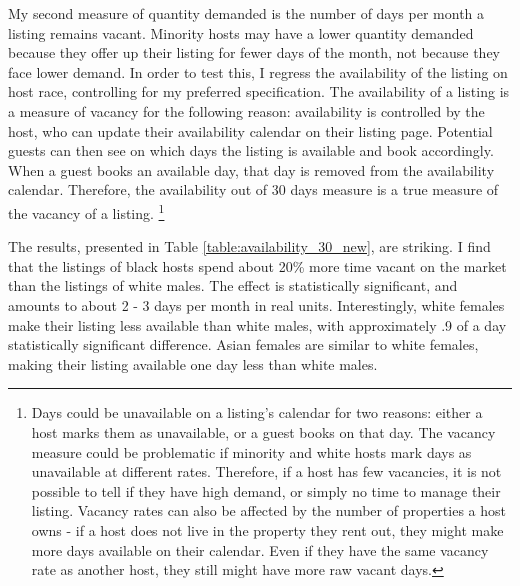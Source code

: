 
My second measure of quantity demanded is the number of days per month a listing remains vacant. Minority hosts may have a lower quantity demanded because they offer up their listing for fewer days of the month, not because they face lower demand. In order to test this, I regress the availability of the listing on host race, controlling for my preferred specification. The availability of a listing is a measure of vacancy for the following reason: availability is controlled by the host, who can update their availability calendar on their listing page. Potential guests can then see on which days the listing is available and book accordingly. When a guest books an available day, that day is removed from the availability calendar. Therefore, the availability out of 30 days measure is a true measure of the vacancy of a listing.%
	\footnote{Days could be unavailable on a listing's calendar for two reasons: either a host marks them as unavailable, or a guest books on that day. The vacancy measure could be problematic if minority and white hosts mark days as unavailable at different rates. Therefore, if a host has few vacancies, it is not possible to tell if they have high demand, or simply no time to manage their listing. Vacancy rates can also be affected by the number of properties a host owns - if a host does not live in the property they rent out, they might make more days available on their calendar. Even if they have the same vacancy rate as another host, they still might have more raw vacant days.}

The results, presented in Table \ref{table:availability_30_new}, are striking. I find that the listings of black hosts spend about 20\% more time vacant on the market than the listings of white males. The effect is statistically significant, and amounts to about 2 - 3 days per month in real units. Interestingly, white females make their listing less available than white males, with approximately .9 of a day statistically significant difference. Asian females are similar to white females, making their listing available one day less than white males. 

